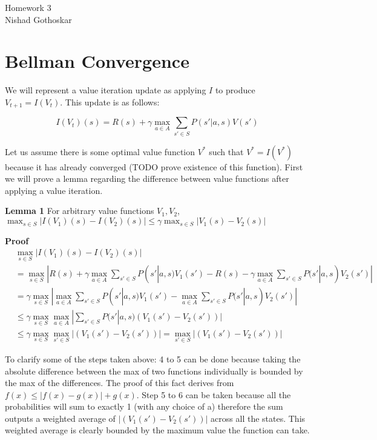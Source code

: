 \documentclass{article}
\begin{document}
\begin{center}
  Homework 3\\
  Nishad Gothoskar
\end{center}

\section{Bellman Convergence}

We will represent a value iteration update as applying $I$ to produce $V_{t+1} = I(V_t)$. This update is as follows:

\begin{equation*}
I(V_t)(s) = R(s) + \gamma \max_{a \in A} \sum_{s' \in S} P(s' | a, s) V(s')
\end{equation*}


Let us assume there is some optimal value function $V^{*}$ such that $V^{*} = I(V^*)$ because it has already converged (TODO prove existence of this function). First we will prove a lemma regarding the difference between value functions after applying a value iteration.
\newline

\textbf{Lemma 1} For arbitrary value functions $V_1, V_2$, $\max_{s \in S} | I(V_1)(s) - I(V_2)(s) | \leq \gamma \max_{s \in S} | V_1(s) - V_2(s) | $

\textbf{Proof} 
\begin{align}
&\max_{s \in S} | I(V_1)(s) - I(V_2)(s) |\\
&= \max_{s \in S} | R(s) + \gamma \max_{a \in A} \sum_{s' \in S} P(s' | a, s) V_1(s') - R(s) - \gamma \max_{a \in A} \sum_{s' \in S} P(s' | a, s) V_2(s') |\\
&= \gamma \max_{s \in S} |  \max_{a \in A} \sum_{s' \in S} P(s' | a, s) V_1(s') - \max_{a \in A} \sum_{s' \in S} P(s' | a, s) V_2(s') |\\
&\leq \gamma \max_{s \in S}  \max_{a \in A}|  \sum_{s' \in S} P(s' | a, s) (V_1(s') - V_2(s')) |\\
&\leq \gamma \max_{s \in S}  \max_{s' \in S}|  (V_1(s') - V_2(s')) | = \max_{s' \in S}|  (V_1(s') - V_2(s')) |
\end{align}

To clarify some of the steps taken above: 4 to 5 can be done because taking the absolute difference between the max of two functions individually is bounded by the max of the differences. The proof of this fact derives from $f(x) \leq |f(x) - g(x)| + g(x)$. Step 5 to 6 can be taken because all the probabilities will sum to exactly 1 (with any choice of a) therefore the sum outputs a weighted average of $| (V_1(s') - V_2(s'))|$ across all the states. This weighted average is clearly bounded by the maximum value the function can take.
\newline
\end{document}
